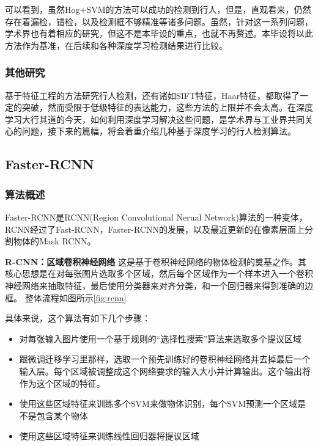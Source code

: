 \documentclass[12pt,a4paper,titlepage]{article}
\begin{document}
可以看到，虽然Hog+SVM的方法可以成功的检测到行人，但是，直观看来，仍然存在着漏检，错检，以及检测框不够精准等诸多问题。虽然，针对这一系列问题，学术界也有着相应的研究，但这不是本毕设的重点，也就不再赘述。本毕设将以此方法作为基准，在后续和各种深度学习检测结果进行比较。


\subsubsection{其他研究}
基于特征工程的方法研究行人检测，还有诸如SIFT特征，Haar特征，都取得了一定的突破，然而受限于低级特征的表达能力，这些方法的上限并不会太高。在深度学习大行其道的今天，如何利用深度学习解决这些问题，是学术界与工业界共同关心的问题，接下来的篇幅，将会着重介绍几种基于深度学习的行人检测算法。

\subsection{Faster-RCNN}
\subsubsection{算法概述}
Faster-RCNN是RCNN(Region Convolutional Nerual Network)算法的一种变体，RCNN经过了Fast-RCNN，Faster-RCNN的发展，以及最近更新的在像素层面上分割物体的Mask RCNN。
\par
\textbf{R-CNN：区域卷积神经网络}
这是基于卷积神经网络的物体检测的奠基之作。其核心思想是在对每张图片选取多个区域，然后每个区域作为一个样本进入一个卷积神经网络来抽取特征，最后使用分类器来对齐分类，和一个回归器来得到准确的边框。
整体流程如图所示\ref{fig:rcnn}

具体来说，这个算法有如下几个步骤：

\begin{itemize}
\item 对每张输入图片使用一个基于规则的“选择性搜索”算法来选取多个提议区域
\item 跟微调迁移学习里那样，选取一个预先训练好的卷积神经网络并去掉最后一个输入层。每个区域被调整成这个网络要求的输入大小并计算输出。这个输出将作为这个区域的特征。
\item 使用这些区域特征来训练多个SVM来做物体识别，每个SVM预测一个区域是不是包含某个物体
\item 使用这些区域特征来训练线性回归器将提议区域
\end{itemize}
\end{document}
